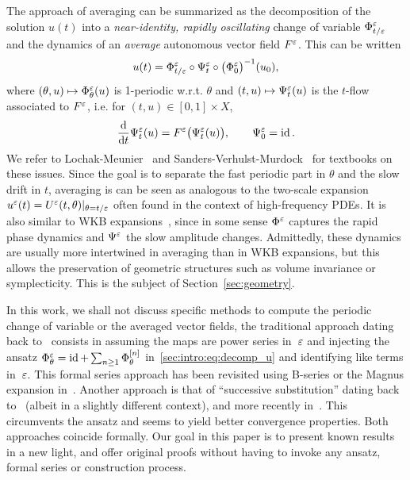The approach of averaging can be summarized as the decomposition of the
solution \( u(t) \) into a \textit{near-identity, rapidly oscillating}
change of variable \(\Phi^{\varepsilon}_{t/\varepsilon} \) and the dynamics of an
\textit{average} autonomous vector field \( F^{\varepsilon} \). This can be written
\begin{equation} \label{sec:intro:eq:decomp_u}
  u(t) = \Phi^{\varepsilon}_{t/\varepsilon} \circ \Psi^{\varepsilon}_t \circ 
    \big( \Phi^{\varepsilon}_0 \big)^{-1} (u_0), 
\end{equation}
where \( (\theta,u) \mapsto \Phi^{\varepsilon}_\theta(u) \) is 1-periodic w.r.t.
\( \theta \) and \( (t,u) \mapsto \Psi^{\varepsilon}_t(u) \) is the $t$-flow
associated to \( F^{\varepsilon} \), i.e. for $(t,u) \in [0,1] \times X$, 
\begin{equation}
  \frac{\mathrm{d}}{\mathrm{d} t} \Psi^{\varepsilon}_t(u) = F^{\varepsilon} \big( \Psi^{\varepsilon}_t(u) \big) ,
  \qquad \Psi^{\varepsilon}_0 = \operatorname{id} . 
\end{equation}
We refer to Lochak-Meunier~\cite{lochak.1988.multiphase} and
Sanders-Verhulst-Murdock~\cite{sanders.2007.averaging} for textbooks on
these issues. Since the goal is to separate the fast periodic part in
$\theta$ and the slow drift in $t$, averaging is can be seen as analogous
to the two-scale expansion $u^{\varepsilon}(t) = U^{\varepsilon}(t, \theta) |_{\theta =
t/\varepsilon}$ often found in the context of high-frequency PDEs. It
is also similar to WKB expansions~\cite{wentzel.1926.eine,kramers.1926.wellenmechanik,brillouin.1926.remarques}, since in some sense $\Phi^{\varepsilon}$
captures the rapid phase dynamics and $\Psi^{\varepsilon}$ the slow amplitude
changes. Admittedly, these dynamics are usually more intertwined in
averaging than in WKB expansions, but this allows the preservation of
geometric structures such as volume invariance or symplecticity. This is
the subject of Section~\ref{sec:geometry}.

In this work, we shall not discuss specific methods to compute the
periodic change of variable or the averaged vector fields, the traditional
approach dating back to~\cite{perko.1969.higher} consists in assuming the
maps are power series in~$\varepsilon$ and injecting the ansatz $\Phi^{\varepsilon}_\theta
= \operatorname{id} + \sum_{n \geq 1} \Phi^{[n]}_{\theta}$
in~\eqref{sec:intro:eq:decomp_u} and identifying like terms in~$\varepsilon$.
This formal series approach has been revisited using B-series or the
Magnus expansion in~\cite{chartier.2010.higher,
chartier.2012.formal, casas.2019.continuous}.
%
Another approach is that of ``successive substitution'' dating back
to~\cite{neishtadt.1984.separation} (albeit in a slightly different
context), and more recently in~\cite{castella.2015.stroboscopic,
chartier.2020.new}. This circumvents the ansatz and seems to yield better
convergence properties. Both approaches coincide formally. 
%
Our goal in this paper is to present known results in a new light, and
offer original proofs without having to invoke any ansatz, formal series
or construction process. 

